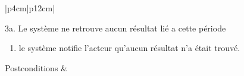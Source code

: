\begin{longtable}{|p{4cm}|p{12cm}|}
                                    \begin{minipage}[t]{\linewidth}
                        3a. Le système ne retrouve aucun résultat lié a cette période  
                        \begin{enumerate}[nosep,after=\strut]
                              \item le système notifie l'acteur qu’aucun résultat n'a était trouvé.
                        \end{enumerate}
                    \end{minipage}
                    \hline
                    Postconditions &   \\
                    \hline
                \caption{Description du cas d'utilisation « Rechercher période »}\\
            \end{longtable}    
    
